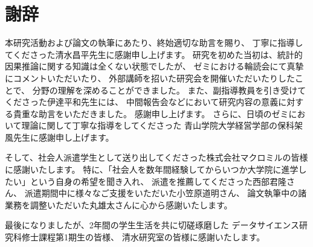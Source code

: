 %
\section*{謝辞}
%
本研究活動および論文の執筆にあたり、終始適切な助言を賜り、
丁寧に指導してくださった清水昌平先生に感謝申し上げます。
研究を初めた当初は、統計的因果推論に関する知識は全くない状態でしたが、
ゼミにおける輪読会にて真摯にコメントいただいたり、
外部講師を招いた研究会を開催いただいたりしたことで、
分野の理解を深めることができました。
また、副指導教員を引き受けてくださった伊達平和先生には、
中間報告会などにおいて研究内容の意義に対する貴重な助言をいただきました。
感謝申し上げます。
さらに、日頃のゼミにおいて理論に関して丁寧な指導をしてくださった
青山学院大学経営学部の保科架風先生に感謝申し上げます。

そして、社会人派遣学生として送り出してくださった株式会社マクロミルの皆様に感謝いたします。
特に、「社会人を数年間経験してからいつか大学院に進学したい」という自身の希望を聞き入れ、
派遣を推薦してくださった西部君隆さん、
派遣期間中に様々なご支援をいただいた小笠原道明さん、
論文執筆中の諸業務を調整いただいた丸雄太さんに心から感謝いたします。

最後になりましたが、2年間の学生生活を共に切磋琢磨した
データサイエンス研究科修士課程第1期生の皆様、
清水研究室の皆様に感謝いたします。
